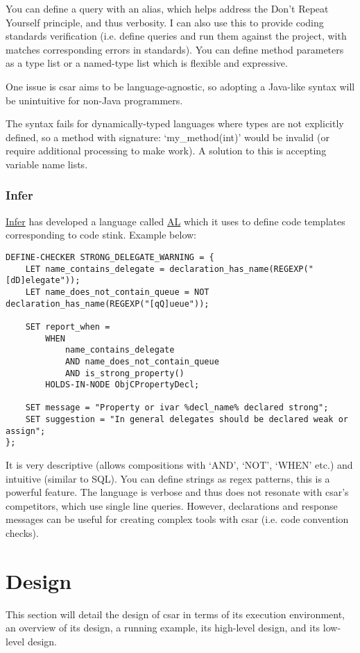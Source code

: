 \documentclass[12pt, letterpaper]{article}
\begin{document}
You can define a query with an alias, which helps address the Don't Repeat Yourself principle, and thus verbosity.
I can also use this to provide coding standards verification (i.e. define queries and run them against the project, with matches corresponding errors in standards).
You can define method parameters as a type list or a named-type list which is flexible and expressive.

One issue is csar aims to be language-agnostic, so adopting a Java-like syntax will be unintuitive for non-Java programmers.

The syntax fails for dynamically-typed languages where types are not explicitly defined, so a method with signature: `my\_method(int)' would be invalid (or require additional processing to make work).
A solution to this is accepting variable name lists.

\subsubsection{Infer}
\href{https://github.com/facebook/infer}{Infer} has developed a language called \href{https://code.facebook.com/posts/277643589367408/}{AL} which it uses to define code templates corresponding to code stink. Example below:  

\begin{lstlisting}
DEFINE-CHECKER STRONG_DELEGATE_WARNING = {
    LET name_contains_delegate = declaration_has_name(REGEXP("[dD]elegate"));
    LET name_does_not_contain_queue = NOT declaration_has_name(REGEXP("[qQ]ueue"));

    SET report_when =
        WHEN
            name_contains_delegate
            AND name_does_not_contain_queue
            AND is_strong_property()
        HOLDS-IN-NODE ObjCPropertyDecl;

    SET message = "Property or ivar %decl_name% declared strong";
    SET suggestion = "In general delegates should be declared weak or assign";
};
\end{lstlisting}

It is very descriptive (allows compositions with `AND', `NOT', `WHEN' etc.) and intuitive (similar to SQL). You can define strings as regex patterns, this is a powerful feature.
The language is verbose and thus does not resonate with csar's competitors, which use single line queries.
However, declarations and response messages can be useful for creating complex tools with csar (i.e. code convention checks).

\section{Design}
This section will detail the design of csar in terms of its execution environment, an overview of its design, a running example, its high-level design, and its low-level design.
\end{document}
